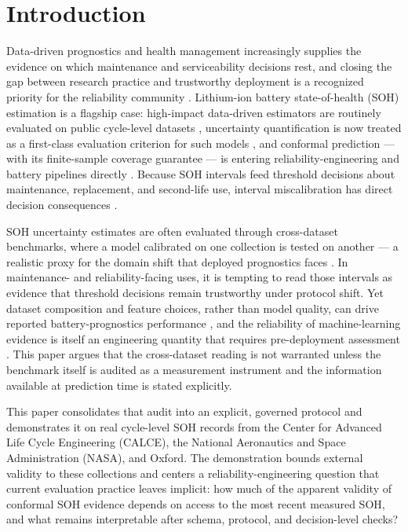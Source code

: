 \documentclass[
  number,
  preprint]{elsarticle}
\begin{document}
\section{Introduction}\label{introduction}

Data-driven prognostics and health management increasingly supplies the
evidence on which maintenance and serviceability decisions rest, and
closing the gap between research practice and trustworthy deployment is
a recognized priority for the reliability community
\citep{zio2022prognostics, lin2026recent}. Lithium-ion battery
state-of-health (SOH) estimation is a flagship case: high-impact
data-driven estimators are routinely evaluated on public cycle-level
datasets \citep{wang2023improved, meng2023long}, uncertainty
quantification is now treated as a first-class evaluation criterion for
such models \citep{basora2025benchmark, nemani2023uncertainty}, and
conformal prediction --- with its finite-sample coverage guarantee ---
is entering reliability-engineering and battery pipelines directly
\citep{xu2026uncertaintyaware, javanmardi2023conformal, soon2026enhancing}.
Because SOH intervals feed threshold decisions about maintenance,
replacement, and second-life use, interval miscalibration has direct
decision consequences
\citep{mitici2023dynamic, zhuang2023prognostic, wang2026multiaction}.

SOH uncertainty estimates are often evaluated through cross-dataset
benchmarks, where a model calibrated on one collection is tested on
another --- a realistic proxy for the domain shift that deployed
prognostics faces \citep{nejjar2024domain}. In maintenance- and
reliability-facing uses, it is tempting to read those intervals as
evidence that threshold decisions remain trustworthy under protocol
shift. Yet dataset composition and feature choices, rather than model
quality, can drive reported battery-prognostics performance
\citep{nagulapati2021capacity, geslin2023selecting}, and the reliability
of machine-learning evidence is itself an engineering quantity that
requires pre-deployment assessment \citep{chen2024evaluating}. This
paper argues that the cross-dataset reading is not warranted unless the
benchmark itself is audited as a measurement instrument and the
information available at prediction time is stated explicitly.

This paper consolidates that audit into an explicit, governed protocol
and demonstrates it on real cycle-level SOH records from the Center for
Advanced Life Cycle Engineering (CALCE), the National Aeronautics and
Space Administration (NASA), and Oxford. The demonstration bounds
external validity to these collections and centers a
reliability-engineering question that current evaluation practice leaves
implicit: how much of the apparent validity of conformal SOH evidence
depends on access to the most recent measured SOH, and what remains
interpretable after schema, protocol, and decision-level checks?
\end{document}
